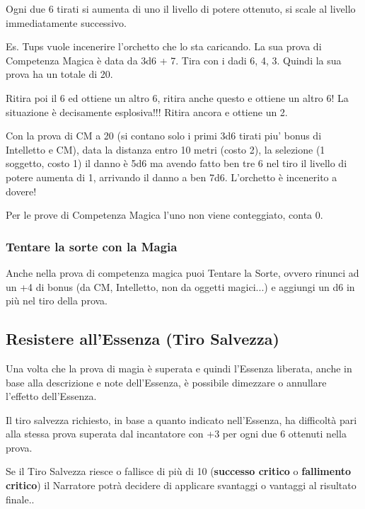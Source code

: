 \documentclass[a4paper,11pt,twoside,openany]{book}
\begin{document}
Ogni due 6 tirati si aumenta di uno il livello di potere ottenuto, si scale al livello immediatamente successivo.

Es. Tups vuole incenerire l'orchetto che lo sta caricando. La sua prova di Competenza Magica è data da 3d6 + 7. Tira con i dadi 6, 4, 3. Quindi la sua prova ha un totale di 20.

Ritira poi il 6 ed ottiene un altro 6, ritira anche questo e ottiene un altro 6! La situazione è decisamente esplosiva!!! Ritira ancora e ottiene un 2.

Con la prova di CM a 20 (si contano solo i primi 3d6 tirati piu' bonus di Intelletto e CM), data la distanza entro 10 metri (costo 2), la selezione (1 soggetto, costo 1) il danno è 5d6 ma avendo fatto ben tre 6 nel tiro il livello di potere aumenta di 1, arrivando il danno a ben 7d6. L'orchetto è incenerito a dovere!

Per le prove di Competenza Magica l'uno non viene conteggiato, conta 0.

\subsubsection{Tentare la sorte con la Magia}

\label{tentare-la-sorte-con-la-magia}

Anche nella prova di competenza magica puoi Tentare la Sorte, ovvero rinunci ad un +4 di bonus (da CM, Intelletto, non da oggetti magici...) e aggiungi un d6 in più nel tiro della prova.

\subsection{Resistere all'Essenza (Tiro Salvezza)}

\label{resistere-allessenza-tiro-salvezza}

Una volta che la prova di magia è superata e quindi l'Essenza liberata, anche in base alla descrizione e note dell'Essenza, è possibile dimezzare o annullare l'effetto dell'Essenza.

Il tiro salvezza richiesto, in base a quanto indicato nell'Essenza, ha difficoltà pari alla stessa prova superata dal incantatore con +3 per ogni due 6 ottenuti nella prova.

Se il Tiro Salvezza riesce o fallisce di più di 10 (\textbf{successo critico} o \textbf{fallimento critico}) il Narratore potrà decidere di applicare svantaggi o vantaggi al risultato finale..
\end{document}
